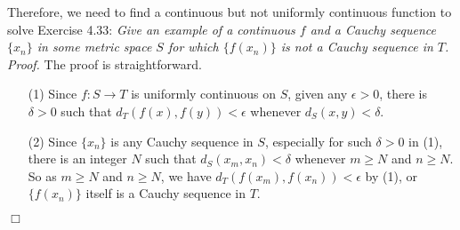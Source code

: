 \documentclass{article}
\begin{document}
Therefore, we need to find a continuous but not uniformly continuous function
to solve Exercise 4.33:
\emph{Give an example of a continuous $f$ and a Cauchy sequence $\{x_n\}$
in some metric space $S$ for which $\{f(x_n)\}$ is not a Cauchy sequence in $T$.} \\

\emph{Proof.}
The proof is straightforward.
\begin{enumerate}
\item[(1)]
Since $f: S \rightarrow T$ is uniformly continuous on $S$,
given any $\epsilon > 0$, there is $\delta > 0$ such that
$d_T(f(x), f(y)) < \epsilon$ whenever $d_S(x, y) < \delta$.
\item[(2)]
Since $\{x_n\}$ is any Cauchy sequence in $S$,
especially for such $\delta > 0$ in (1), there is an integer $N$ such that
$d_S(x_m, x_n) < \delta$ whenever $m \geq N$ and $n \geq N$.
So as $m \geq N$ and $n \geq N$, we have
$d_T(f(x_m), f(x_n)) < \epsilon$ by (1),
or $\{f(x_n)\}$ itself is a Cauchy sequence in $T$.
\end{enumerate}
$\Box$ \\\\
\end{document}
